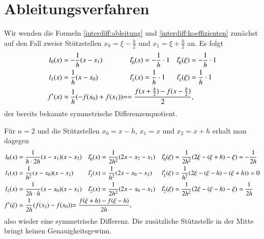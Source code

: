 \section{Ableitungsverfahren
\label{section:interdiff:ableitung}}
Wir wenden die Formeln
\eqref{interdiff:ableitung}
und
\eqref{interdiff:koeffizienten}
zunächst auf den Fall zweier Stützstellen $x_0=\xi-\frac{h}2$ und
$x_1=\xi+\frac{h}2$ an.
Es folgt
\begin{align*}
l_0(x)
&=
-\frac{1}{h} (x-x_1)
&
l_0'(x)
&=
-\frac1h \cdot 1
&
l_0'(\xi)
&=
-\frac1h \cdot 1
\\
l_1(x)
&=
\frac1{h} (x-x_0)
&
l_1'(x)
&=
\frac1h \cdot 1
&
l_1'(\xi)
&=
\frac1h \cdot 1
\\
f'(x)
&\approx
\frac1h(- f(x_0)+f(x_1))
\rlap{$\displaystyle=
= \frac{f(x+\frac{h}2)-f(x-\frac{h}2)}{2},$}
\end{align*}
der bereits bekannte symmetrische Differenzenquotient.

Für $n=2$ und die Stützstellen $x_0=x-h$, $x_1=x$ und $x_2=x+h$ erhalt man
dagegen
\begin{align*}
l_0(x)
&=
\frac{1}{h\cdot 2h} (x-x_1)(x-x_2)
&
l_0'(x)
&=
\frac{1}{2h^2}(2x-x_2-x_1)
&
l_0'(\xi)
&=
\frac{1}{2h^2}(2\xi -(\xi+h) -\xi)
=
-\frac{1}{2h}
\\
l_1(x)
&=
\frac{1}{h^2} (x-x_0)(x-x_2)
&
l'_1(x)
&=
\frac{1}{h^2} (2x-x_0-x_2)
&
l'_1(\xi)
&=
\frac{1}{h^2}(2\xi-(\xi-h)-(\xi+h)) = 0
\\
l_2(x)
&=
\frac{1}{2h\cdot h} (x-x_0)(x-x_1)
&
l'_2(x)
&=
\frac{1}{2h^2} (2x-x_0-x_1)
&
l'_2(\xi)
&=
\frac{1}{2h^2} (2\xi-(\xi-h)-\xi)
=
\frac{1}{2h}
\\
f'(\xi)
&\approx
\frac{1}{2h}(f(x_2) - f(x_0))
\rlap{$\displaystyle= \frac{f(\xi+h)-f(\xi-h)}{2h},$}
\end{align*}
also wieder eine symmetrische Differenz.
Die zusätzliche Stützstelle in der Mitte bringt keinen Genauigkeitsgewinn.

